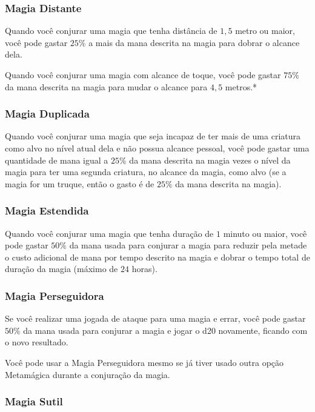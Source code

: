 \documentclass{RPG_Adventure}[2021/10/20]
\begin{document}
\subsubsection*{Magia Distante}%
\label{ssub:magia_distante}

Quando você conjurar uma magia que tenha distância de $1,5$ metro ou maior, você
pode gastar $25\%$ a mais da mana descrita na magia para dobrar o alcance dela.

Quando você conjurar uma magia com alcance de toque, você pode gastar $75\%$ da
mana descrita na magia para mudar o alcance para $4,5$ metros.*

\subsubsection*{Magia Duplicada}%
\label{ssub:magia_duplicada}

Quando você conjurar uma magia que seja incapaz de ter mais de uma criatura como
alvo no nível atual dela e não possua alcance pessoal, você pode gastar uma
quantidade de mana igual a $25\%$ da mana descrita na magia vezes o nível da
magia para ter uma segunda criatura, no alcance da magia, como alvo (se a magia
for um truque, então o gasto é de $25\%$ da mana descrita na magia).

\subsubsection{Magia Estendida}%
\label{ssub:magia_estendida}

Quando você conjurar uma magia que tenha duração de $1$ minuto ou maior, você
pode gastar $50\%$ da mana usada para conjurar a magia para reduzir pela metade o
custo adicional de mana por tempo descrito na magia e dobrar o tempo total de
duração da magia (máximo de $24$ horas).

\subsubsection*{Magia Perseguidora}%
\label{ssub:magia_perseguidora}

Se você realizar uma jogada de ataque para uma magia e errar, você pode gastar
$50\%$ da mana usada para conjurar a magia e jogar o d20 novamente, ficando com
o novo resultado.

Você pode usar a Magia Perseguidora mesmo se já tiver usado outra opção
Metamágica durante a conjuração da magia.

\subsubsection*{Magia Sutil}%
\label{ssub:magia_sutil}
\end{document}
